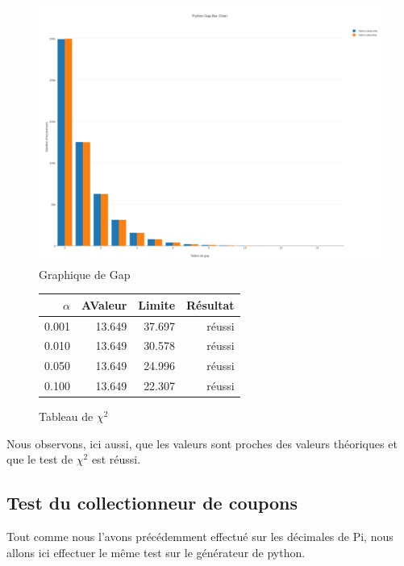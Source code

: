\documentclass[10pt,a4paper]{article}
\begin{document}
\begin{figure}[h]
\centering
\includegraphics[scale=0.20]{../chart_images/python_gap_bar_chart.png}
\caption{Graphique de Gap}
\end{figure}

\begin{figure}[h]
	\centering
	\begin{tabular}{|r|r|r|r|}
		\hline
		$\alpha$ & AValeur & Limite & Résultat\\
		\hline
		0.001 & 13.649 & 37.697 & réussi\\
		0.010 & 13.649 & 30.578 & réussi\\
		0.050 & 13.649 & 24.996 & réussi\\
		0.100 & 13.649 & 22.307 & réussi\\
		\hline
	\end{tabular}
	\caption{Tableau de $\chi^2$}
\end{figure}


\newpage

Nous observons, ici aussi, que les valeurs sont proches des valeurs théoriques et que le test de $\chi^2$  est réussi.

\newpage

\subsection{Test du collectionneur de coupons}

Tout comme nous l'avons précédemment effectué sur les décimales de Pi, nous allons ici effectuer le même test sur le générateur de python.
\end{document}
